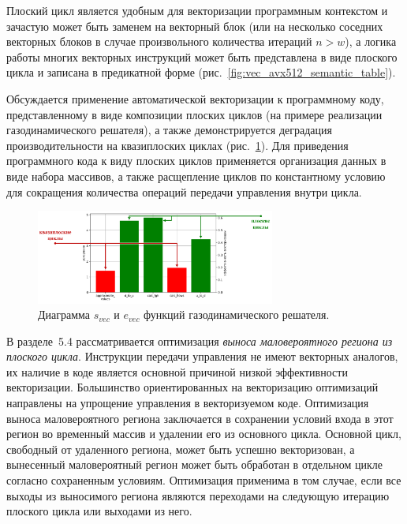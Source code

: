 \documentclass[a4paper,14pt]{extarticle}                     %
\theoremstyle{plain}                                         %
\begin{document}
Плоский цикл является удобным для векторизации программным контекстом и зачастую может быть заменем на векторный блок (или на несколько соседних векторных блоков в случае произвольного количества итераций $n > w$), а логика работы многих векторных инструкций может быть представлена в виде плоского цикла и записана в предикатной форме (рис.~\ref{fig:vec_avx512_semantic_table}).

Обсуждается применение автоматической векторизации к программному коду, представленному в виде композиции плоских циклов (на примере реализации газодинамического решателя), а также демонстрируется деградация производительности на квазиплоских циклах (рис.~\ref{fig:vec_diagram_ibm_functions}).
Для приведения программного кода к виду плоских циклов применяется организация данных в виде набора массивов, а также расщепление циклов по константному условию для сокращения количества операций передачи управления внутри цикла.

\begin{figure}[!ht]
\centering
\includegraphics[width=0.7\textwidth]{./fig/vec_diagram_ibm_functions.pdf}
\singlespacing
\caption{Диаграмма $s_{vec}$ и $e_{vec}$ функций газодинамического решателя.}
\label{fig:vec_diagram_ibm_functions}
\end{figure}


В разделе~5.4 рассматривается оптимизация \textit{выноса маловероятного региона из плоского цикла}.
Инструкции передачи управления не имеют векторных аналогов, их наличие в коде является основной причиной низкой эффективности векторизации.
Большинство ориентированных на векторизацию оптимизаций направлены на упрощение управления в векторизуемом коде. 
Оптимизация выноса маловероятного региона заключается в сохранении условий входа в этот регион во временный массив и удалении его из основного цикла.
Основной цикл, свободный от удаленного региона, может быть успешно векторизован, а вынесенный маловероятный регион может быть обработан в отдельном цикле согласно сохраненным условиям.
Оптимизация применима в том случае, если все выходы из выносимого региона являются переходами на следующую итерацию плоского цикла или выходами из него.
\end{document}

